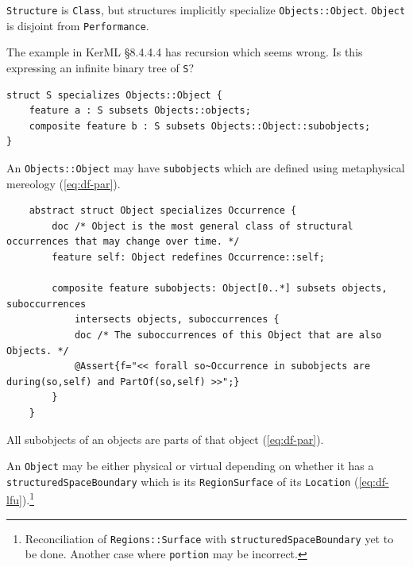 

\pn \texttt{Structure} is \texttt{Class}, but structures implicitly specialize \texttt{Objects::Object}.  \texttt{Object} is disjoint from \texttt{Performance}.

\pn The example in KerML \S8.4.4.4 has recursion which seems wrong.  Is this expressing an infinite binary tree of \texttt{S}?%
\begin{lstlisting}
struct S specializes Objects::Object {
	feature a : S subsets Objects::objects;
	composite feature b : S subsets Objects::Object::subobjects;
}
\end{lstlisting}

\pn An \texttt{Objects::Object} may have \texttt{subobjects} which are defined using metaphysical mereology (\ref{eq:df-par}).
\begin{lstlisting}
	abstract struct Object specializes Occurrence {
		doc /* Object is the most general class of structural occurrences that may change over time. */
		feature self: Object redefines Occurrence::self;
		
		composite feature subobjects: Object[0..*] subsets objects, suboccurrences
			intersects objects, suboccurrences {
			doc /* The suboccurrences of this Object that are also Objects. */
			@Assert{f="<< forall so~Occurrence in subobjects are during(so,self) and PartOf(so,self) >>";}
		}
	}
\end{lstlisting}

\pn All subobjects of an objects are parts of that object (\ref{eq:df-par}).



\pn An \texttt{Object} may be either physical or virtual depending on whether it has a \texttt{structuredSpaceBoun\-dary} which is its
\texttt{RegionSurface} of its \texttt{Location} (\ref{eq:df-lfu}).\footnote{
Reconciliation of \texttt{Regions::Surface} with \texttt{structuredSpaceBoundary} yet to be done.  Another case where \texttt{portion} may be incorrect.}

